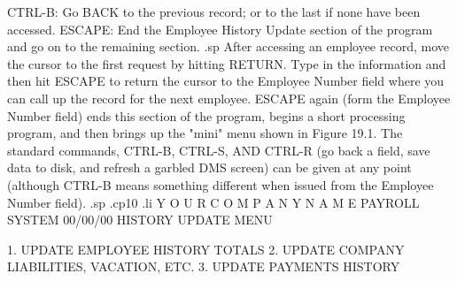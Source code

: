 	  CTRL-B: Go BACK to the previous record; or to
		  the last if none have been accessed.
	  ESCAPE: End the Employee History Update section
		  of the program and go on to the remaining
		  section.
.sp
After accessing an employee record, move the cursor to the first
request by hitting RETURN.  Type in the information and then
hit ESCAPE to return the cursor to the Employee Number field
where you can call up the record for the next employee.  ESCAPE
again (form the Employee Number field) ends this section of the
program, begins a short processing program, and then
brings up the "mini" menu shown in Figure 19.1.
The standard commands, CTRL-B, CTRL-S, AND CTRL-R (go back a field,
save data to disk, and refresh a garbled DMS screen) can be given
at any point (although CTRL-B means something different when issued
from the Employee Number field).
.sp
.cp10
.li
	      Y O U R	 C O M P A N Y	  N A M E
			PAYROLL SYSTEM
  00/00/00	     HISTORY UPDATE MENU


	      1. UPDATE EMPLOYEE HISTORY TOTALS
	      2. UPDATE COMPANY LIABILITIES, VACATION, ETC.
	      3. UPDATE PAYMENTS HISTORY

